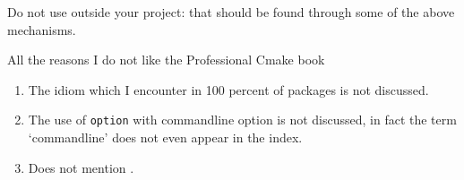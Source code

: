 Do not use  outside your project:
that should be found through some of the above mechanisms.

 {All the reasons I do not like the Professional Cmake book}

\begin{enumerate}
\item The  idiom which I encounter in 100 percent of packages is not discussed.
\item The use of \lstinline{option} with commandline option is not discussed,
  in fact the term `commandline' does not even appear in the index.
\item Does not mention .
\end{enumerate}

